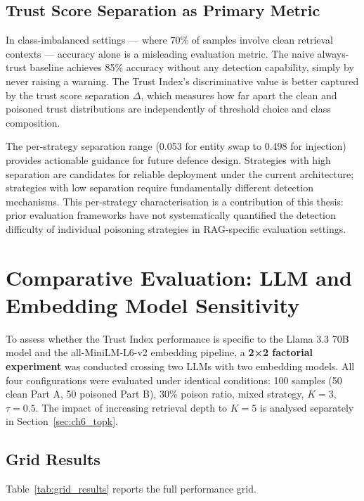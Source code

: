 \subsection{Trust Score Separation as Primary Metric}

In class-imbalanced settings --- where 70\% of samples involve clean retrieval contexts
--- accuracy alone is a misleading evaluation metric. The naive always-trust baseline
achieves 85\% accuracy without any detection capability, simply by never raising a
warning. The Trust Index's discriminative value is better captured by the trust score
separation $\Delta$, which measures how far apart the clean and poisoned trust
distributions are independently of threshold choice and class composition.

The per-strategy separation range (0.053 for entity swap to 0.498 for injection) provides
actionable guidance for future defence design. Strategies with high separation are
candidates for reliable deployment under the current architecture; strategies with low
separation require fundamentally different detection mechanisms. This per-strategy
characterisation is a contribution of this thesis: prior evaluation frameworks have not
systematically quantified the detection difficulty of individual poisoning strategies in
RAG-specific evaluation settings.

\section{Comparative Evaluation: LLM and Embedding Model Sensitivity}
\label{sec:ch6_grid}

To assess whether the Trust Index performance is specific to the Llama 3.3 70B model and
the all-MiniLM-L6-v2 embedding pipeline, a \textbf{2×2 factorial experiment} was conducted
crossing two LLMs with two embedding models. All four configurations were evaluated under
identical conditions: 100 samples (50 clean Part A, 50 poisoned Part B), 30\% poison ratio,
mixed strategy, $K=3$, $\tau=0.5$. The impact of increasing retrieval depth to $K=5$ is
analysed separately in Section~\ref{sec:ch6_topk}.

\subsection{Grid Results}

Table~\ref{tab:grid_results} reports the full performance grid.

